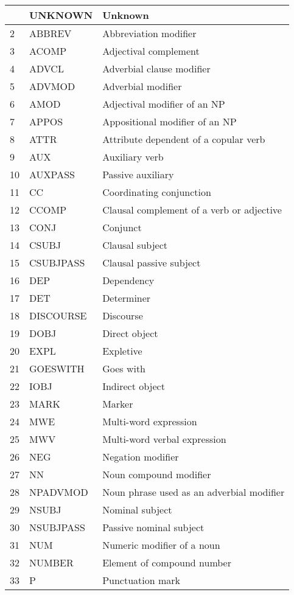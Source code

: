\begin{longtable}{|p{1cm}|p{1.5in}|p{2.5in}|}
\hline \hline
\endlastfoot
1&UNKNOWN&Unknown \\ \hline
2&ABBREV&Abbreviation modifier \\ \hline
3&ACOMP&Adjectival complement \\ \hline
4&ADVCL&Adverbial clause modifier \\ \hline
5&ADVMOD&Adverbial modifier \\ \hline
6&AMOD&Adjectival modifier of an NP \\ \hline
7&APPOS&Appositional modifier of an NP \\ \hline
8&ATTR&Attribute dependent of a copular verb \\ \hline
9&AUX&Auxiliary verb \\ \hline
10&AUXPASS&Passive auxiliary \\ \hline
11&CC&Coordinating conjunction \\ \hline
12&CCOMP&Clausal complement of a verb or adjective \\ \hline
13&CONJ&Conjunct \\ \hline
14&CSUBJ&Clausal subject \\ \hline
15&CSUBJPASS&Clausal passive subject \\ \hline
16&DEP&Dependency \\ \hline
17&DET&Determiner \\ \hline
18&DISCOURSE&Discourse \\ \hline
19&DOBJ&Direct object \\ \hline
20&EXPL&Expletive \\ \hline
21&GOESWITH&Goes with \\ \hline
22&IOBJ&Indirect object \\ \hline
23&MARK&Marker \\ \hline
24&MWE&Multi-word expression \\ \hline
25&MWV&Multi-word verbal expression \\ \hline
26&NEG&Negation modifier \\ \hline
27&NN&Noun compound modifier \\ \hline
28&NPADVMOD&Noun phrase used as an adverbial modifier \\ \hline
29&NSUBJ&Nominal subject \\ \hline
30&NSUBJPASS&Passive nominal subject \\ \hline
31&NUM&Numeric modifier of a noun \\ \hline
32&NUMBER&Element of compound number \\ \hline
33&P&Punctuation mark \\ \hline

\end{longtable}
